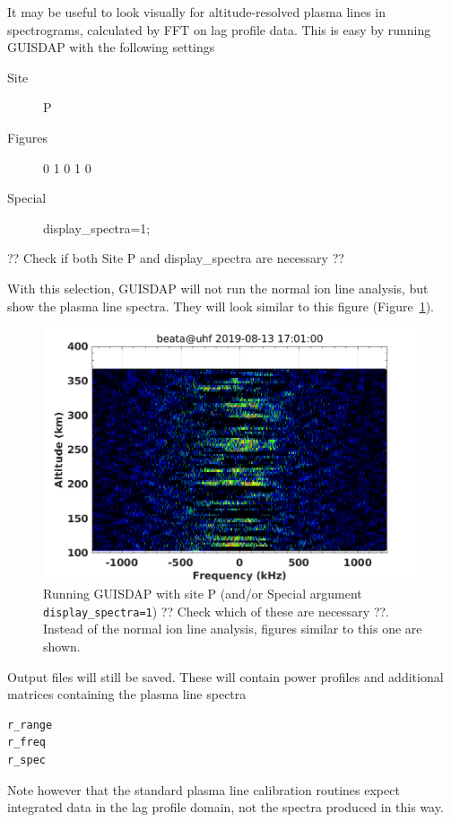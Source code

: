 \documentclass[a4]{article}
\begin{document}
It may be useful to look visually for altitude-resolved plasma lines
in spectrograms, calculated by FFT on lag profile data. This is easy
by running GUISDAP with the following settings

\begin{description}
 
\item[Site] P
\item[Figures] 0 1 0 1 0
\item[Special] display\_spectra=1;
\end{description}

?? Check if both Site P and display\_spectra are necessary ??

With this selection, GUISDAP will not run the normal ion line
analysis, but show the plasma line spectra. They will look similar to
this figure (Figure~\ref{fig:pl-spec}).

\begin{figure}[b]
  \begin{center}
    \includegraphics[width=0.8\linewidth]{pl_display_spec}
  \end{center}
  \caption{\label{fig:pl-spec}Running GUISDAP with site P (and/or Special argument \texttt{display\_spectra=1}) ?? Check which of these are necessary  ??. \newline{}Instead of the normal ion line analysis, figures similar to this one are shown.}
\end{figure}


Output files will still be saved. These will contain power profiles
and additional matrices containing the plasma line spectra
\begin{verbatim}
r_range
r_freq
r_spec
\end{verbatim}

Note however that the standard plasma line calibration routines expect
integrated data in the lag profile domain, not the spectra produced in
this way.
\end{document}
